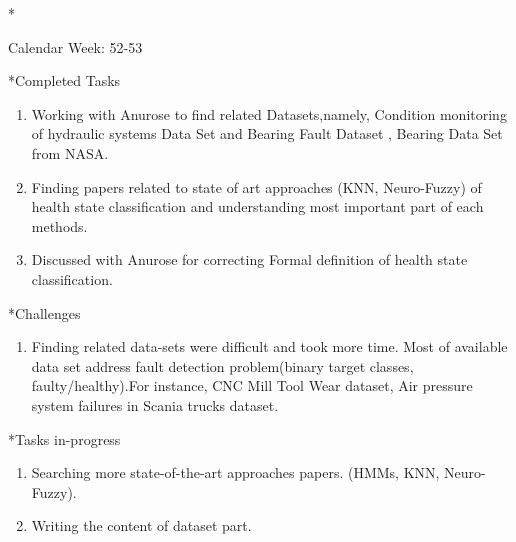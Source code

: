 \documentclass[11pt,a4paper]{article}
\begin{document}
\newpage
\begin{section}*{Calendar Week: 52-53 \hfill \date{30 December, 2020}}
 \begin{refsection}

       \begin{subsection}*{Completed Tasks}
             \begin{enumerate}
                 \item Working with Anurose to find related Datasets,namely, Condition monitoring of hydraulic systems Data Set \cite{DBLP:conf/i2mtc/HelwigPS15}and Bearing Fault Dataset , Bearing Data Set from NASA. 
                 \item Finding papers related to state of art approaches (KNN, Neuro-Fuzzy) of health state classification and understanding most important part of each methods.
                 \item Discussed with Anurose for correcting Formal definition of health state classification.
             \end{enumerate}
                 
       \end{subsection}
       
       \begin{subsection}*{Challenges}
		\begin{enumerate}
			\item Finding related data-sets were difficult and took more time. Most of available data set address fault detection problem(binary target classes, faulty/healthy).For instance, CNC Mill Tool Wear dataset, Air pressure system failures in Scania trucks dataset.
		\end{enumerate}
	\end{subsection}

       \begin{subsection}*{Tasks in-progress}
             \begin{enumerate}
                   \item  Searching more state-of-the-art approaches papers. (HMMs, KNN, Neuro-Fuzzy).
                   \item Writing the content of dataset part.

             \end{enumerate}
       \end{subsection}

       \printbibliography
 \end{refsection}
\end{section}
\end{document}
